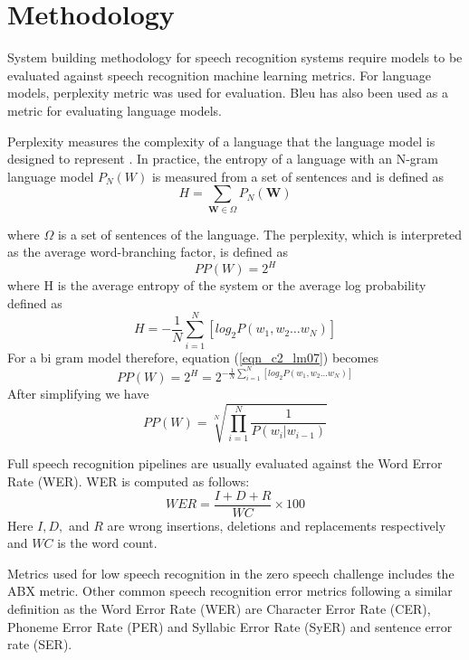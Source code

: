 \section{Methodology}
System building methodology \citep{nunamaker1990systems} for speech recognition systems require models to be evaluated against speech recognition machine learning metrics.  For language models, perplexity metric was used for evaluation.  Bleu has also been used as a metric for evaluating language models.

Perplexity measures the complexity of a language that the language model is designed to represent \citep{1976jelinekcontinuous}. In practice, the entropy of a language with an N-gram language model $P_N(W)$ is measured from a set of sentences and is defined as
\begin{equation}H=\sum_{\mathbf{W}\in\Omega}P_N(\mathbf{W})
\label{eqn_c2_lm05}
\end{equation}

where $\Omega$ is a set of sentences of the language. The perplexity, which is interpreted as the average word-branching factor, is defined as
\begin{equation}PP(W)=2^H
\label{eqn_c2_lm06}
\end{equation}
where H is the average entropy of the system or the average log probability defined as
\begin{equation}
H=-\frac{1}{N}\sum_{i=1}^N[log_2P(w_1,w_2\dots w_N)]
\label{eqn_c2_lm07}
\end{equation}
For a bi gram model therefore, equation (\ref{eqn_c2_lm07}) becomes
\begin{equation}
PP(W)=2^H=2^{-\frac{1}{N}\sum_{i=1}^N[log_2P(w_1,w_2\dots w_N)]}
\label{eqn_c2_lm08}
\end{equation}
After simplifying we have
\begin{equation}
PP(W)=\sqrt[N]{\prod_{i=1}^N\frac{1}{P(w_i|w_{i-1})}}
\label{eqn_c2_lm09}
\end{equation}


Full speech recognition pipelines are usually evaluated against the Word Error Rate (WER).  WER is computed as follows:
\begin{equation}\label{eqn_2_3_wer}
WER=\frac{I+D+R}{WC}\times 100
\end{equation}
Here $I,D,$ and $R$ are wrong insertions, deletions and replacements respectively and $WC$ is the word count.

Metrics used for low speech recognition in the zero speech challenge \citep{versteegh2015zero} includes the ABX metric. Other common speech recognition error metrics following a similar definition as the Word Error Rate (WER) are Character Error Rate (CER), Phoneme Error Rate (PER) and Syllabic Error Rate (SyER) and sentence error rate (SER).